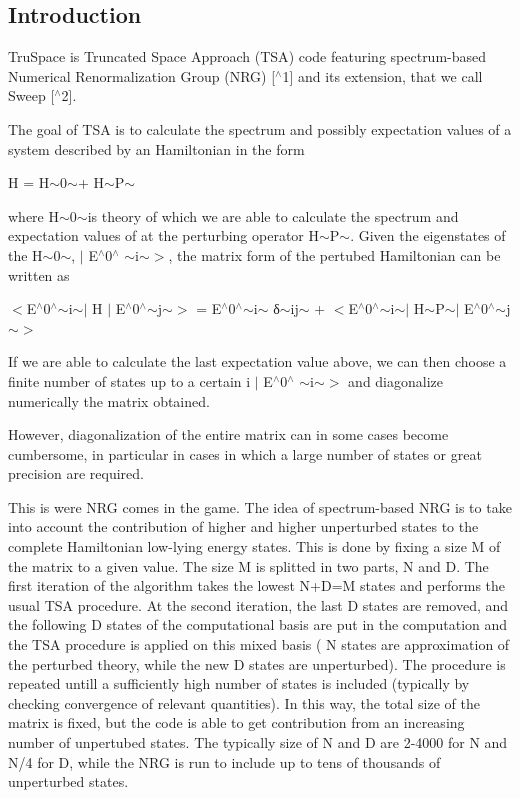 \subsection*{Introduction }

Tru\+Space is Truncated Space Approach ({\ttfamily T\+SA}) code featuring spectrum-\/based Numerical Renormalization Group ({\ttfamily N\+RG}) \mbox{[}$^\wedge$1\mbox{]} and its extension, that we call {\ttfamily Sweep} \mbox{[}$^\wedge$2\mbox{]}.

The goal of {\ttfamily T\+SA} is to calculate the spectrum and possibly expectation values of a system described by an Hamiltonian in the form

H = H$\sim$0$\sim$+ H$\sim$\+P$\sim$

where H$\sim$0$\sim$is theory of which we are able to calculate the spectrum and expectation values of at the perturbing operator H$\sim$\+P$\sim$. Given the eigenstates of the H$\sim$0$\sim$, $\vert$ E$^\wedge$0$^\wedge$ $\sim$i$\sim$$>$, the matrix form of the pertubed Hamiltonian can be written as

$<$E$^\wedge$0$^\wedge$$\sim$i$\sim$$\vert$ H $\vert$ E$^\wedge$0$^\wedge$$\sim$j$\sim$$>$ = E$^\wedge$0$^\wedge$$\sim$i$\sim$ δ$\sim$ij$\sim$ + $<$E$^\wedge$0$^\wedge$$\sim$i$\sim$$\vert$ H$\sim$\+P$\sim$$\vert$ E$^\wedge$0$^\wedge$$\sim$j$\sim$$>$

If we are able to calculate the last expectation value above, we can then choose a finite number of states up to a certain i $\vert$ E$^\wedge$0$^\wedge$ $\sim$i$\sim$$>$ and diagonalize numerically the matrix obtained.

However, diagonalization of the entire matrix can in some cases become cumbersome, in particular in cases in which a large number of states or great precision are required.

This is were {\ttfamily N\+RG} comes in the game. The idea of spectrum-\/based {\ttfamily N\+RG} is to take into account the contribution of higher and higher unperturbed states to the complete Hamiltonian low-\/lying energy states. This is done by fixing a size M of the matrix to a given value. The size M is splitted in two parts, N and D. The first iteration of the algorithm takes the lowest N+D=M states and performs the usual {\ttfamily T\+SA} procedure. At the second iteration, the last D states are removed, and the following D states of the computational basis are put in the computation and the {\ttfamily T\+SA} procedure is applied on this mixed basis ( N states are approximation of the perturbed theory, while the new D states are unperturbed). The procedure is repeated untill a sufficiently high number of states is included (typically by checking convergence of relevant quantities). In this way, the total size of the matrix is fixed, but the code is able to get contribution from an increasing number of unpertubed states. The typically size of N and D are 2-\/4000 for N and N/4 for D, while the {\ttfamily N\+RG} is run to include up to tens of thousands of unperturbed states.

